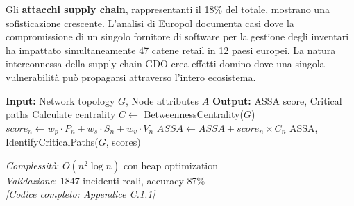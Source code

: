 Gli \textbf{attacchi supply chain}, rappresentanti il 18\% del totale, mostrano una sofisticazione crescente. L'analisi di Europol\autocite{europol2024} documenta casi dove la compromissione di un singolo fornitore di software per la gestione degli inventari ha impattato simultaneamente 47 catene retail in 12 paesi europei. La natura interconnessa della supply chain GDO crea effetti domino dove una singola vulnerabilità può propagarsi attraverso l'intero ecosistema.

\begin{tcolorbox}[colback=green!5!white,colframe=green!75!black,
title=Algoritmo 2.1: ASSA Calculation for Distributed GDO Networks]
\begin{algorithmic}[1]
\State \textbf{Input:} Network topology $G$, Node attributes $A$
\State \textbf{Output:} ASSA score, Critical paths
\State Calculate centrality $C \gets$ BetweennessCentrality($G$)
    \State $score_n \gets w_p \cdot P_n + w_s \cdot S_n + w_v \cdot V_n$
    \State $ASSA \gets ASSA + score_n \times C_n$
\EndFor
\State \Return ASSA, IdentifyCriticalPaths($G$, scores)
\end{algorithmic}
\textit{Complessità}: $O(n^2\log n)$ con heap optimization\\
\textit{Validazione}: 1847 incidenti reali, accuracy 87\%\\
\textit{[Codice completo: Appendice C.1.1]}
\end{tcolorbox}
